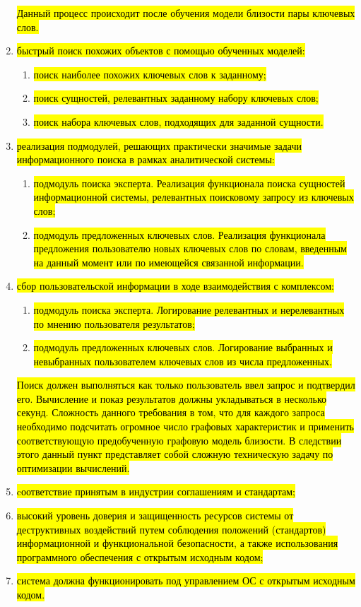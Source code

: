 \begin{enumerate}
    \hl{Данный процесс происходит после обучения модели близости пары ключевых слов.}
    \item \hl{быстрый поиск похожих объектов с помощью обученных моделей:}
    \begin{enumerate}
        \item \hl{поиск наиболее похожих ключевых слов к заданному;}
        \item \hl{поиск сущностей, релевантных заданному набору ключевых слов;}
        \item \hl{поиск набора ключевых слов, подходящих для заданной сущности.}
    \end{enumerate}
    \item \hl{реализация подмодулей, решающих практически значимые задачи информационного поиска в рамках аналитической системы:}
    \begin{enumerate}
        \item \hl{подмодуль поиска эксперта. Реализация функционала поиска сущностей информационной системы, релевантных поисковому запросу из ключевых слов;}
        \item \hl{подмодуль предложенных ключевых слов. Реализация функционала предложения пользователю новых ключевых слов по словам, введенным на данный момент или по имеющейся связанной информации.}
    \end{enumerate}
    \item \hl{сбор пользовательской информации в ходе взаимодействия с комплексом:}
    \begin{enumerate}
        \item \hl{подмодуль поиска эксперта. Логирование релевантных и нерелевантных по мнению пользователя результатов;}
        \item \hl{подмодуль предложенных ключевых слов. Логирование выбранных и невыбранных пользователем ключевых слов из числа предложенных.}
    \end{enumerate}
    \hl{Поиск должен выполняться как только пользователь ввел запрос и подтвердил его. Вычисление и показ результатов должны укладываться в несколько секунд. Сложность данного требования в том, что для каждого запроса необходимо подсчитать огромное число графовых характеристик и применить соответствующую предобученную графовую модель близости. В следствии этого данный пункт представляет собой сложную техническую задачу по оптимизации вычислений.}
    \item \hl{cоответствие принятым в индустрии соглашениям и стандартам;}
    \item \hl{высокий уровень доверия и защищенность ресурсов системы от деструктивных воздействий путем соблюдения положений (стандартов) информационной и функциональной безопасности, а также использования программного обеспечения с открытым исходным кодом;}
    \item \hl{система должна функционировать под управлением ОС с открытым исходным кодом.}
\end{enumerate}

